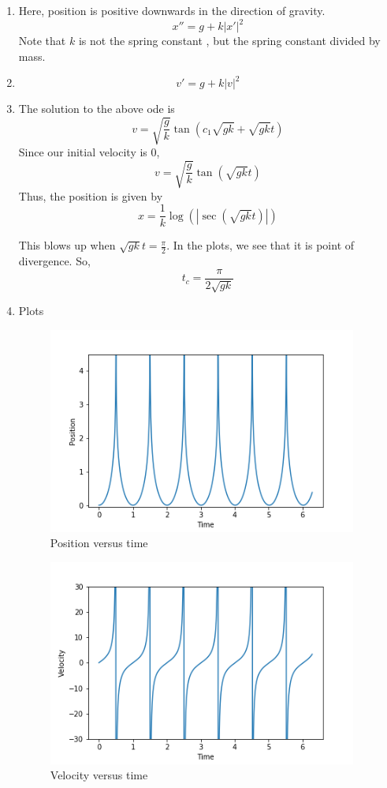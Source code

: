 \documentclass[letterpaper,12pt]{article}
\begin{document}
\begin{enumerate}
\begin{enumerate}
\item
Here, position is positive downwards in the direction of gravity.
\[x'' = g+k|x'|^2\]
Note that $k$ is not the spring constant , but the spring constant divided by mass.
\item
\[v' = g+k|v|^2\]
\item
 The solution to the above ode is
 \[v = \sqrt{\frac{g}{k}} \tan(c_1 \sqrt{gk}+  \sqrt{gk}t)\]
 Since our initial velocity is 0,
  \[v = \sqrt{\frac{g}{k}} \tan(  \sqrt{gk}t)\]
	Thus, the position is given by
	\[x = \frac{1}{k} \log(|\sec(\sqrt{gk}t)|) \]

	This blows up when $\sqrt{gk}t = \frac{\pi}{2}$. In the plots, we see that it is point of divergence. So,
	\[t_c = \frac{\pi}{2\sqrt{gk}}\]

\item
 Plots
\begin{figure}[H]
\begin{centering}
\includegraphics[width=4in]{Position.png}
\caption{Position versus time}
\end{centering}
\end{figure}


\begin{figure}[H]
\begin{centering}
\includegraphics[width=4in]{Velocity.png}
\caption{Velocity versus time}
\end{centering}
\end{figure}


\end{enumerate}
\end{enumerate}
\end{document}
